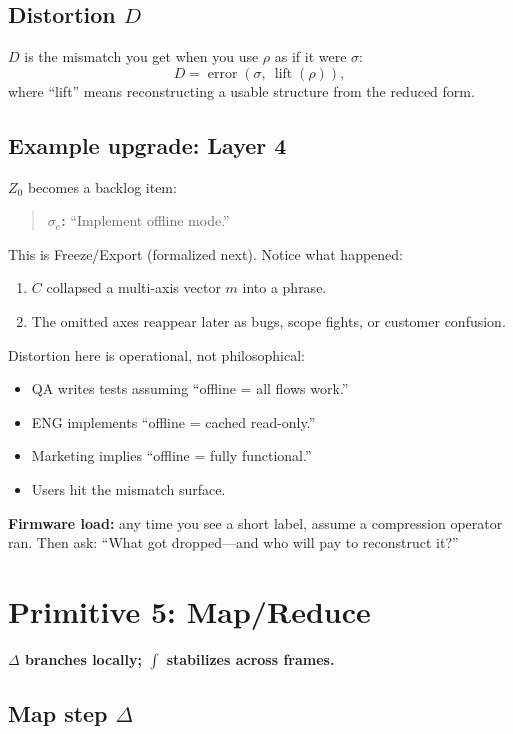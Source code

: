 \documentclass[11pt]{article}
\begin{document}
\subsection{Distortion $D$}

$D$ is the mismatch you get when you use $\rho$ as if it were $\sigma$:
\[
  D = \operatorname{error}(\sigma,\ \operatorname{lift}(\rho)),
\]
where ``lift'' means reconstructing a usable structure from the reduced form.

\subsection{Example upgrade: Layer 4}

$Z_0$ becomes a backlog item:
\begin{quote}
  \textbf{$\sigma_e$:} ``Implement offline mode.''
\end{quote}

This is Freeze/Export (formalized next). Notice what happened:
\begin{enumerate}[leftmargin=2em]
  \item $C$ collapsed a multi-axis vector $m$ into a phrase.
  \item The omitted axes reappear later as bugs, scope fights, or customer confusion.
\end{enumerate}

Distortion here is operational, not philosophical:
\begin{itemize}[leftmargin=2em]
  \item QA writes tests assuming ``offline = all flows work.''
  \item ENG implements ``offline = cached read-only.''
  \item Marketing implies ``offline = fully functional.''
  \item Users hit the mismatch surface.
\end{itemize}

\textbf{Firmware load:} any time you see a short label, assume a compression operator ran. Then ask: ``What got dropped---and who will pay to reconstruct it?''

\section{Primitive 5: Map/Reduce}

\textbf{$\Delta$ branches locally; $\int$ stabilizes across frames.}

\subsection{Map step $\Delta$}
\end{document}
